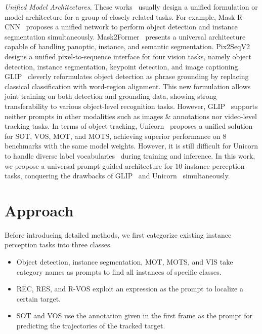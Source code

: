 \documentclass[10pt,twocolumn,letterpaper]{article}
\begin{document}
\textit{Unified Model Architectures}. These works~\cite{MaskRCNN,Mask2Former,GLIP,Pix2SeqV2,Unicorn} usually design a unified formulation or model architecture for a group of closely related tasks. For example, Mask R-CNN~\cite{MaskRCNN} proposes a unified network to perform object detection and instance segmentation simultaneously. Mask2Former~\cite{Mask2Former} presents a universal architecture capable of handling panoptic, instance, and semantic segmentation. Pix2SeqV2~\cite{Pix2SeqV2} designs a unified pixel-to-sequence interface for four vision tasks, namely object detection, instance segmentation, keypoint detection, and image captioning. GLIP~\cite{GLIP} cleverly reformulates object detection as phrase grounding by replacing classical classification with word-region alignment. This new formulation allows joint training on both detection and grounding data, showing strong transferability to various object-level recognition tasks. However, GLIP~\cite{GLIP} supports neither prompts in other modalities such as images \& annotations nor video-level tracking tasks. In terms of object tracking, Unicorn~\cite{Unicorn} proposes a unified solution for SOT, VOS, MOT, and MOTS, achieving superior performance on 8 benchmarks with the same model weights. However, it is still difficult for Unicorn to handle diverse label vocabularies~\cite{COCO,MOT17,BDD100K,TAO,VIS,OVIS} during training and inference. In this work, we propose a universal prompt-guided architecture for 10 instance perception tasks, conquering the drawbacks of GLIP~\cite{GLIP} and Unicorn~\cite{Unicorn} simultaneously. 


\section{Approach}
Before introducing detailed methods, we first categorize existing instance perception tasks into three classes. 
\begin{itemize}
    \vspace{-1mm}
    \item{
    Object detection, instance segmentation, MOT, MOTS, and VIS take category names as prompts to find all instances of specific classes.} 
    \vspace{-1mm}
    \item{
    REC, RES, and R-VOS exploit an expression as the prompt to localize a certain target.} 
    \vspace{-1mm}
    \item{
    SOT and VOS use the annotation given in the first frame as the prompt for predicting the trajectories of the tracked target.}
\end{itemize}
\end{document}
